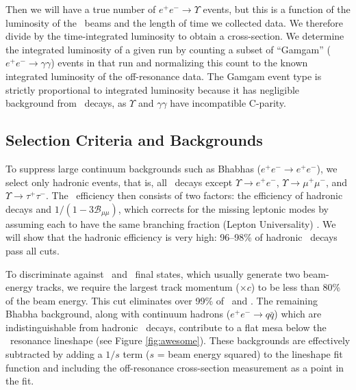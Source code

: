 \documentclass[aps,prd,preprint,superscriptaddress,tightenlines,nofootinbib,floatfix]{revtex4}
\begin{document}
Then we will have a true number of $e^+e^- \to \Upsilon$ events, but
this is a function of the luminosity of the \ee\ beams and the length
of time we collected data.  We therefore divide by the time-integrated
luminosity to obtain a cross-section.  %
We determine the integrated luminosity of a given run by counting a
subset of ``Gamgam'' ($e^+e^- \to \gamma\gamma$) events in that run
and normalizing this count to the known integrated luminosity of the
off-resonance data.
The Gamgam event type is strictly proportional to integrated luminosity because
it has negligible background from
\ups\ decays, as $\Upsilon$ and $\gamma\gamma$ have incompatible
C-parity.

%
\subsection{Selection Criteria and Backgrounds} \label{sec:back}
%

To suppress large continuum backgrounds such as Bhabhas ($e^+e^- \to
e^+e^-$), we select only hadronic events, that is, all \ups\ decays
except $\Upsilon \to e^+e^-$, $\Upsilon \to \mu^+\mu^-$, and $\Upsilon
\to \tau^+\tau^-$.  The \ups\ efficiency then consists of two factors:
the efficiency of hadronic decays and $1/(1 - 3
\mathcal{B}_{\mu\mu})$, which corrects for the missing leptonic modes
by assuming each to have the same branching fraction (Lepton
Universality) \cite{pdg}.  We will show that the hadronic efficiency is very
high: 96--98\% of hadronic \ups\ decays pass all cuts.

To discriminate against \ee\ and \mm\ final states, which usually
generate two beam-energy tracks, we require the largest track momentum
($\times c$) to be less than 80\% of the beam energy.  This cut
eliminates over 99\% of \ee\ and \mm.  The remaining Bhabha
background, along with continuum hadrons ($e^+e^- \to q\bar{q}$) which
are indistinguishable from hadronic \ups\ decays, contribute to a flat
mesa below the \ups\ resonance lineshape (see Figure
\ref{fig:awesome}).  These backgrounds are effectively subtracted by
adding a $1/s$ term ($s$ = beam energy squared) to the lineshape fit
function and including the off-resonance cross-section measurement as
a point in the fit.
\end{document}
